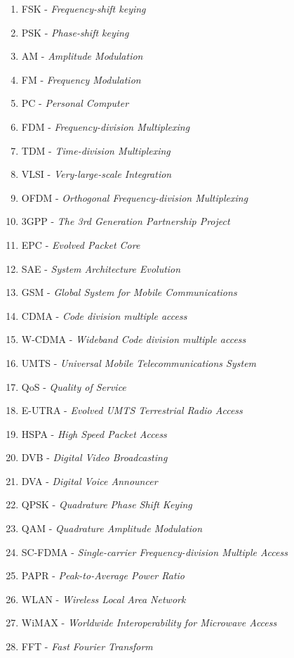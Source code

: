 \begin{enumerate}
	\item FSK - \textit{Frequency-shift keying}
	\item PSK - \textit{Phase-shift keying}
	\item AM - \textit{Amplitude Modulation}
	\item FM - \textit{Frequency Modulation}
	\item PC - \textit{Personal Computer}
	\item FDM - \textit{Frequency-division Multiplexing}
	\item TDM - \textit{Time-division Multiplexing}
	\item VLSI - \textit{Very-large-scale Integration}
	\item OFDM - \textit{Orthogonal Frequency-division Multiplexing}
	\item 3GPP - \textit{The 3rd Generation Partnership Project}
	\item EPC - \textit{Evolved Packet Core}
	\item SAE - \textit{System Architecture Evolution}
	\item GSM - \textit{Global System for Mobile Communications}
	\item CDMA - \textit{Code division multiple access}
	\item W-CDMA - \textit{Wideband Code division multiple access}
	\item UMTS - \textit{Universal Mobile Telecommunications System}
	\item QoS - \textit{Quality of Service}
	\item E-UTRA - \textit{Evolved UMTS Terrestrial Radio Access}
	\item HSPA - \textit{High Speed Packet Access}
	\item DVB - \textit{Digital Video Broadcasting}
	\item DVA - \textit{Digital Voice Announcer}
	\item QPSK - \textit{Quadrature Phase Shift Keying}
	\item QAM - \textit{Quadrature Amplitude Modulation}
	\item SC-FDMA - \textit{Single-carrier Frequency-division Multiple Access}
	\item PAPR - \textit{Peak-to-Average Power Ratio}
	\item WLAN - \textit{Wireless Local Area Network}
	\item WiMAX - \textit{Worldwide Interoperability for Microwave Access}
	\item FFT - \textit{Fast Fourier Transform}

\end{enumerate}
